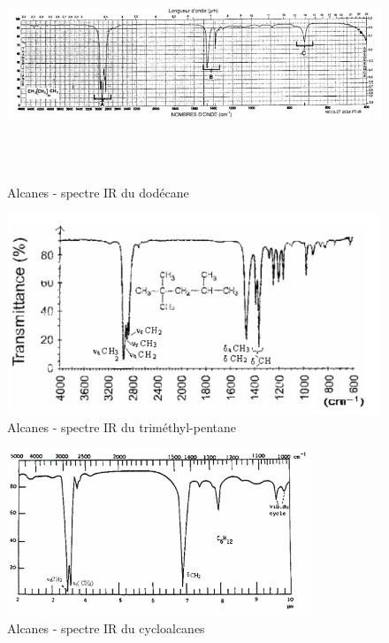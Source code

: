 \begin{figure}[H]
    \centering
    \includegraphics[height=7cm,angle=90]{assets/figures/alcanes1.png}
    \caption{Alcanes - spectre IR du dodécane \cite{Hydrocarbures}}
\end{figure}

\begin{figure}[H]
    \centering
    \includegraphics[height=6cm,angle=90]{assets/figures/alcanes2.png}
    \caption{Alcanes - spectre IR du triméthyl-pentane \cite{Hydrocarbures}}
\end{figure}

\begin{figure}[H]
    \centering
    \includegraphics[height=5cm,angle=90]{assets/figures/alcanes3.png}
    \caption{Alcanes - spectre IR du cycloalcanes \cite{Hydrocarbures}}
\end{figure}

